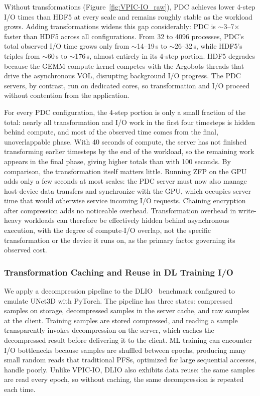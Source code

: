 Without transformations (Figure~\ref{fig:VPIC-IO_raw}), PDC achieves lower 4-step I/O times than HDF5 at every scale and remains roughly stable as the workload grows. Adding transformations widens this gap considerably: PDC is $\sim$3--7$\times$ faster than HDF5 across all configurations. From 32 to 4096 processes, PDC's total observed I/O time grows only from $\sim$14--19\,s to $\sim$26--32\,s, while HDF5's triples from $\sim$60\,s to $\sim$176\,s, almost entirely in its 4-step portion. HDF5 degrades because the GEMM compute kernel competes with the Argobots threads that drive the asynchronous VOL, disrupting background I/O progress. The PDC servers, by contrast, run on dedicated cores, so transformation and I/O proceed without contention from the application.

For every PDC configuration, the 4-step portion is only a small fraction of the total: nearly all transformation and I/O work in the first four timesteps is hidden behind compute, and most of the observed time comes from the final, unoverlappable phase. With 40 seconds of compute, the server has not finished transforming earlier timesteps by the end of the workload, so the remaining work appears in the final phase, giving higher totals than with 100 seconds. By comparison, the transformation itself matters little. Running ZFP on the GPU adds only a few seconds at most scales: the PDC server must now also manage host-device data transfers and synchronize with the GPU, which occupies server time that would otherwise service incoming I/O requests. Chaining encryption after compression adds no noticeable overhead. Transformation overhead in write-heavy workloads can therefore be effectively hidden behind asynchronous execution, with the degree of compute-I/O overlap, not the specific transformation or the device it runs on, as the primary factor governing its observed cost.

\subsubsection{Transformation Caching and Reuse in DL Training I/O}
\label{sec:dlio-eval}

We apply a decompression pipeline to the DLIO~\cite{devarajan2021dlio} benchmark configured to emulate UNet3D with PyTorch. The pipeline has three states: compressed samples on storage, decompressed samples in the server cache, and raw samples at the client. Training samples are stored compressed, and reading a sample transparently invokes decompression on the server, which caches the decompressed result before delivering it to the client. ML training can encounter I/O bottlenecks because samples are shuffled between epochs, producing many small random reads that traditional PFSs, optimized for large sequential accesses, handle poorly. Unlike VPIC-IO, DLIO also exhibits data reuse: the same samples are read every epoch, so without caching, the same decompression is repeated each time. 

